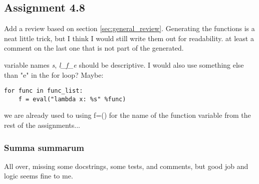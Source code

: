 \documentclass[a4paper]{article}
\begin{document}
\subsection*{Assignment 4.8}
Add a review based on section \ref{sec:general_review}.
\newline\newline
Generating the functions is a neat little trick, 
but I think I would still write them out for readability.
at least a comment on the last one that is not part of the generated.

variable names \emph{s}, \emph{l\_f\_e} should be descriptive.
I would also use something else than "e" in the for loop?
Maybe:
\begin{verbatim}
for func in func_list:
	f = eval("lambda x: %s" %func)
\end{verbatim}
    
we are already used to using f=()
for the name of the function variable from the rest of the assignments...

\subsubsection*{Summa summarum}
All over, missing some docstrings, some tests, and comments, but good job and logic seems fine to me.




\end{document}
